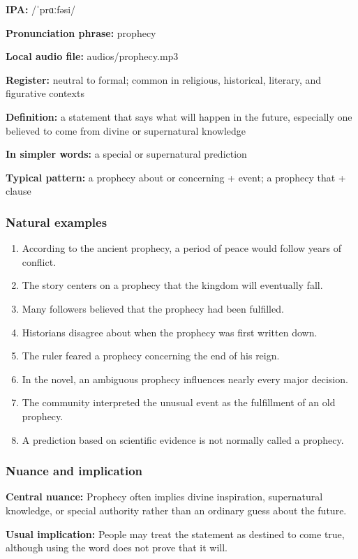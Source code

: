 \documentclass[11pt]{article}
\begin{document}
\textbf{IPA:} /ˈprɑːfəsi/

\textbf{Pronunciation phrase:} prophecy

\textbf{Local audio file:} audios/prophecy.mp3

\textbf{Register:} neutral to formal; common in religious, historical, literary, and figurative contexts

\textbf{Definition:} a statement that says what will happen in the future, especially one believed to come from divine or supernatural knowledge

\textbf{In simpler words:} a special or supernatural prediction

\textbf{Typical pattern:} a prophecy about or concerning + event; a prophecy that + clause

\subsubsection{Natural examples}
\begin{enumerate}
  \item According to the ancient prophecy, a period of peace would follow years of conflict.
  \item The story centers on a prophecy that the kingdom will eventually fall.
  \item Many followers believed that the prophecy had been fulfilled.
  \item Historians disagree about when the prophecy was first written down.
  \item The ruler feared a prophecy concerning the end of his reign.
  \item In the novel, an ambiguous prophecy influences nearly every major decision.
  \item The community interpreted the unusual event as the fulfillment of an old prophecy.
  \item A prediction based on scientific evidence is not normally called a prophecy.
\end{enumerate}

\subsubsection{Nuance and implication}
\textbf{Central nuance:} Prophecy often implies divine inspiration, supernatural knowledge, or special authority rather than an ordinary guess about the future.

\textbf{Usual implication:} People may treat the statement as destined to come true, although using the word does not prove that it will.
\end{document}
